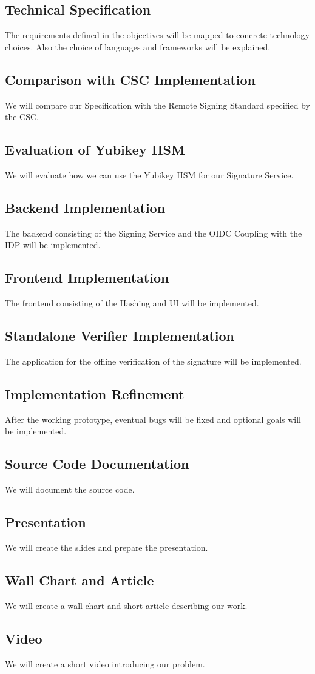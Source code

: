 \subsection{Technical Specification}
The requirements defined in the objectives will be mapped to concrete technology choices.
Also the choice of languages and frameworks will be explained.

\subsection{Comparison with CSC Implementation}
We will compare our Specification with the Remote Signing Standard specified by the \gls{CSC}.

\subsection{Evaluation of Yubikey HSM}
We will evaluate how we can use the Yubikey HSM for our Signature Service.

\subsection{Backend Implementation}
The backend consisting of the Signing Service and the OIDC Coupling with the IDP will be implemented.

\subsection{Frontend Implementation}
The frontend consisting of the Hashing and UI will be implemented.

\subsection{Standalone Verifier Implementation}
The application for the offline verification of the signature will be implemented.

\subsection{Implementation Refinement}
After the working prototype, eventual bugs will be fixed and optional goals will be implemented.

\subsection{Source Code Documentation}
We will document the source code.

\subsection{Presentation}
We will create the slides and prepare the presentation.

\subsection{Wall Chart and Article}
We will create a wall chart and short article describing our work.

\subsection{Video}
We will create a short video introducing our problem.